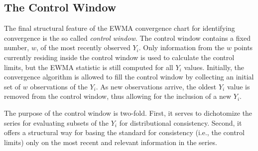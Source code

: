 \documentclass[12pt]{article}
\begin{document}
%
%
\subsection{The Control Window}
%
%

The final structural feature of the EWMA convergence chart for identifying convergence is the so called {\it control window}.
The control window contains a fixed number, $w$, of the most recently observed $Y_i$.
Only information from the $w$ points currently residing inside the control window is used to calculate the control limits, but the EWMA statistic is still computed for all $Y_i$ values.
%
Initially, the convergence algorithm is allowed to fill the control window by collecting an initial set of $w$ observations of the $Y_i$.
%
As new observations arrive, the oldest $Y_i$ value is removed from the control window, thus allowing for the inclusion of a new $Y_i$.

%
%

%
The purpose of the control window is two-fold.
First, it serves to dichotomize the series for evaluating subsets of the $Y_i$ for distributional consistency.
Second, it offers a structural way for basing the standard for consistency (i.e., the control limits) only on the most recent and relevant information in the series. 
%

%
%
\end{document}

